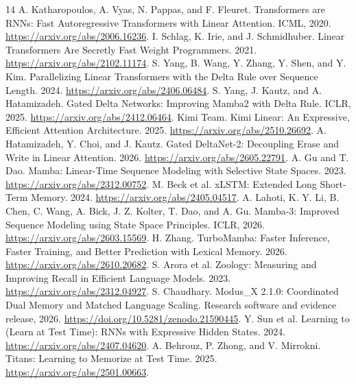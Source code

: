 \documentclass[10pt]{article}
\begin{document}
\begin{thebibliography}{14}\footnotesize
\setlength{\itemsep}{1pt}\setlength{\parskip}{0pt}
 A. Katharopoulos, A. Vyas, N. Pappas, and F. Fleuret.
Transformers are RNNs: Fast Autoregressive Transformers with Linear Attention.
ICML, 2020. \url{https://arxiv.org/abs/2006.16236}.
 I. Schlag, K. Irie, and J. Schmidhuber.
Linear Transformers Are Secretly Fast Weight Programmers. 2021.
\url{https://arxiv.org/abs/2102.11174}.
 S. Yang, B. Wang, Y. Zhang, Y. Shen, and Y. Kim.
Parallelizing Linear Transformers with the Delta Rule over Sequence Length. 2024.
\url{https://arxiv.org/abs/2406.06484}.
 S. Yang, J. Kautz, and A. Hatamizadeh.
Gated Delta Networks: Improving Mamba2 with Delta Rule. ICLR, 2025.
\url{https://arxiv.org/abs/2412.06464}.
 Kimi Team. Kimi Linear: An Expressive, Efficient Attention
Architecture. 2025. \url{https://arxiv.org/abs/2510.26692}.
 A. Hatamizadeh, Y. Choi, and J. Kautz.
Gated DeltaNet-2: Decoupling Erase and Write in Linear Attention. 2026.
\url{https://arxiv.org/abs/2605.22791}.
 A. Gu and T. Dao. Mamba: Linear-Time Sequence Modeling with
Selective State Spaces. 2023. \url{https://arxiv.org/abs/2312.00752}.
 M. Beck et al. xLSTM: Extended Long Short-Term Memory. 2024.
\url{https://arxiv.org/abs/2405.04517}.
 A. Lahoti, K. Y. Li, B. Chen, C. Wang, A. Bick,
J. Z. Kolter, T. Dao, and A. Gu. Mamba-3: Improved Sequence Modeling using
State Space Principles. ICLR, 2026. \url{https://arxiv.org/abs/2603.15569}.
 H. Zhang. TurboMamba: Faster Inference, Faster Training,
and Better Prediction with Lexical Memory. 2026. \url{https://arxiv.org/abs/2610.20682}.
 S. Arora et al. Zoology: Measuring and Improving Recall in
Efficient Language Models. 2023. \url{https://arxiv.org/abs/2312.04927}.
 S. Chaudhary. Modus\_X 2.1.0: Coordinated Dual Memory and
Matched Language Scaling. Research software and evidence release, 2026.
\url{https://doi.org/10.5281/zenodo.21590445}.
 Y. Sun et al. Learning to (Learn at Test Time): RNNs with
Expressive Hidden States. 2024. \url{https://arxiv.org/abs/2407.04620}.
 A. Behrouz, P. Zhong, and V. Mirrokni. Titans: Learning
to Memorize at Test Time. 2025. \url{https://arxiv.org/abs/2501.00663}.
\end{thebibliography}

\appendix
\end{document}

